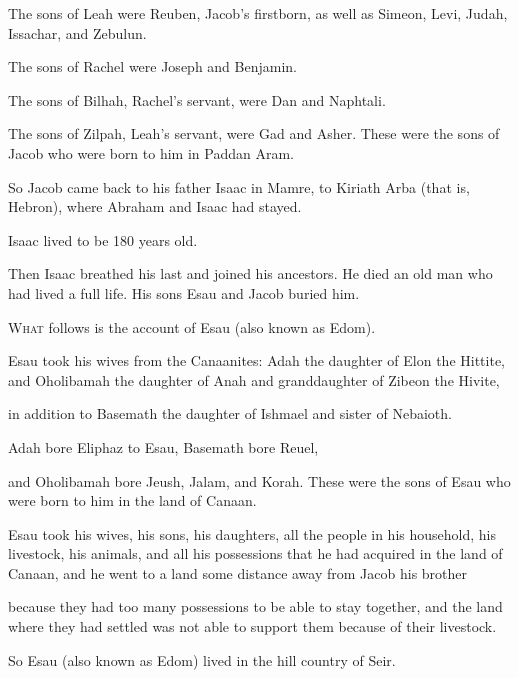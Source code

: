 \begin{scripture}
 The sons of Leah were Reuben, Jacob's firstborn, as well as Simeon, Levi, Judah, Issachar, and Zebulun.
\everypar{}

 The sons of Rachel were Joseph and Benjamin.
\everypar{}

 The sons of Bilhah, Rachel's servant, were Dan and Naphtali.
\everypar{}

 The sons of Zilpah, Leah's servant, were Gad and Asher. These were the sons of Jacob who were born to him in Paddan Aram.
\everypar{}

 So Jacob came back to his father Isaac in Mamre, to Kiriath Arba (that is, Hebron), where Abraham and Isaac had stayed.
 Isaac lived to be 180 years old.
 Then Isaac breathed his last and joined his ancestors. He died an old man who had lived a full life. His sons Esau and Jacob buried him.

 \allowchapbreak\hypertarget{ch-genesis-36}{}\lettrine[lines=5]{\color{pentateuch}W}{\textsc{hat}} follows is the account of Esau (also known as Edom).\everypar{}
\\\indent{} Esau took his wives from the Canaanites: Adah the daughter of Elon the Hittite, and Oholibamah the daughter of Anah and granddaughter of Zibeon the Hivite,
 in addition to Basemath the daughter of Ishmael and sister of Nebaioth.
\\\indent{} Adah bore Eliphaz to Esau, Basemath bore Reuel,
 and Oholibamah bore Jeush, Jalam, and Korah. These were the sons of Esau who were born to him in the land of Canaan.
\everypar{}

 Esau took his wives, his sons, his daughters, all the people in his household, his livestock, his animals, and all his possessions that he had acquired in the land of Canaan, and he went to a land some distance away from Jacob his brother
 because they had too many possessions to be able to stay together, and the land where they had settled was not able to support them because of their livestock.
 So Esau (also known as Edom) lived in the hill country of Seir.
\everypar{}


\end{scripture}
